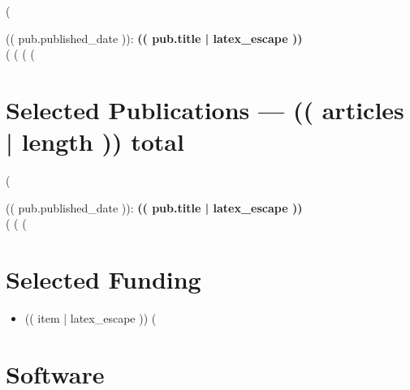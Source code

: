 \documentclass[10pt]{article}
\begin{document}
\begin{etaremune}
(%
\item
  (( pub.published_date )): \textbf{(( pub.title | latex_escape ))}\\
  (%
  (%
  (%
(%
\end{etaremune}

\section{Selected Publications --- (( articles | length )) total}

\begin{etaremune}
(%
\item
  (( pub.published_date )): \textbf{(( pub.title | latex_escape ))}\\
  (%
  (%
(%
\end{etaremune}

\section{Selected Funding}

\begin{itemize}
(%
  \item (( item | latex_escape ))
(%
\end{itemize}

\section{Software}
\end{document}
